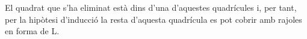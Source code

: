 \begin{enumerate}
\begin{enumerate}
{El quadrat que s'ha eliminat està dins d'una d'aquestes quadrícules
i, per tant, per la hipòtesi d'inducció la resta d'aquesta
quadrícula es pot cobrir amb rajoles en forma de L.

}
\end{enumerate}
\feedback
\end{enumerate}